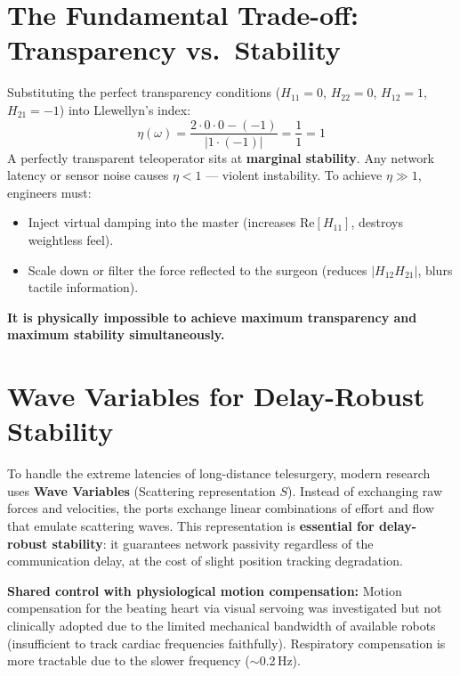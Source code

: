 \documentclass[11pt,a4paper,twoside]{report}
\begin{document}
\section{The Fundamental Trade-off: Transparency vs.\ Stability}
Substituting the perfect transparency conditions ($H_{11}=0$, $H_{22}=0$, $H_{12}=1$, $H_{21}=-1$) into Llewellyn's index:
\begin{equation}
    \eta(\omega) = \frac{2 \cdot 0 \cdot 0 - (-1)}{|1 \cdot (-1)|} = \frac{1}{1} = 1
\end{equation}
A perfectly transparent teleoperator sits at \textbf{marginal stability}. Any network latency or sensor noise causes $\eta < 1$ — violent instability. To achieve $\eta \gg 1$, engineers must:
\begin{itemize}
    \item Inject virtual damping into the master (increases $\text{Re}[H_{11}]$, destroys weightless feel).
    \item Scale down or filter the force reflected to the surgeon (reduces $|H_{12}H_{21}|$, blurs tactile information).
\end{itemize}
\textbf{It is physically impossible to achieve maximum transparency and maximum stability simultaneously.}

\section{Wave Variables for Delay-Robust Stability}
To handle the extreme latencies of long-distance telesurgery, modern research uses \textbf{Wave Variables} (Scattering representation $S$). Instead of exchanging raw forces and velocities, the ports exchange linear combinations of effort and flow that emulate scattering waves. This representation is \textbf{essential for delay-robust stability}: it guarantees network passivity regardless of the communication delay, at the cost of slight position tracking degradation.

\textbf{Shared control with physiological motion compensation:} Motion compensation for the beating heart via visual servoing was investigated but not clinically adopted due to the limited mechanical bandwidth of available robots (insufficient to track cardiac frequencies faithfully). Respiratory compensation is more tractable due to the slower frequency ($\sim$0.2\,Hz).


\end{document}
